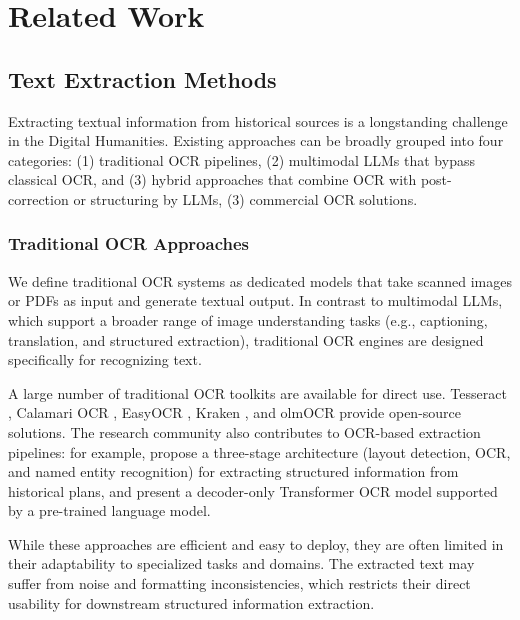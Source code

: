 \chapter{Related Work}
\section{Text Extraction Methods}
Extracting textual information from historical sources is a longstanding challenge in the Digital Humanities. Existing approaches can be broadly grouped into four categories: (1) traditional OCR pipelines, (2) multimodal LLMs that bypass classical OCR, and (3) hybrid approaches that combine OCR with post-correction or structuring by LLMs, (3) commercial OCR solutions.

\subsection{Traditional OCR Approaches}
We define traditional OCR systems as dedicated models that take scanned images or PDFs as input and generate textual output. In contrast to multimodal LLMs, which support a broader range of image understanding tasks (e.g., captioning, translation, and structured extraction), traditional OCR engines are designed specifically for recognizing text.

A large number of traditional OCR toolkits are available for direct use. Tesseract \parencite{DBLP:conf/icdar/Smith07}, Calamari OCR \parencite{DBLP:journals/dhq/WickRP20}, EasyOCR \parencite{easyocr}, Kraken \parencite{kraken_ocr}, and olmOCR \parencite{olmocrbench} provide open-source solutions. The research community also contributes to OCR-based extraction pipelines: for example, \textcite{loeffler2023digitize} propose a three-stage architecture (layout detection, OCR, and named entity recognition) for extracting structured information from historical plans, and \textcite{DBLP:conf/wacv/Fujitake24} present a decoder-only Transformer OCR model supported by a pre-trained language model.

While these approaches are efficient and easy to deploy, they are often limited in their adaptability to specialized tasks and domains. The extracted text may suffer from noise and formatting inconsistencies, which restricts their direct usability for downstream structured information extraction.


